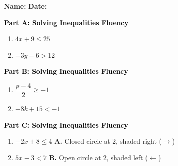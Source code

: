 \documentclass[12pt, letterpaper, fleqn]{article}
\begin{document}
\textbf{Name:} \underline{\hspace{5cm}}
\hfill
\textbf{Date:} \underline{\hspace{3cm}}\\

\begin{tcolorbox}[colback=customteal!20]
\large\textcolor{black}{\textbf{Part A: Solving Inequalities Fluency}}
\end{tcolorbox}

\vspace{3mm}

\begin{enumerate}[itemsep=2.5cm, leftmargin=0.6cm]
\item $4x + 9 \le 25$
\item $-3y - 6 > 12$
\end{enumerate}

\newpage

\begin{tcolorbox}[colback=customteal!20]
\large\textcolor{black}{\textbf{Part B: Solving Inequalities Fluency}}
\end{tcolorbox}

\vspace{3mm}

\begin{enumerate}[itemsep=2.5cm, leftmargin=0.6cm, resume]
\item $\dfrac{p - 4}{2} \ge -1$
\item $-8k + 15 < -1$
\end{enumerate}

\newpage

\begin{tcolorbox}[colback=customteal!20]
\large\textcolor{black}{\textbf{Part C: Solving Inequalities Fluency}}
\end{tcolorbox}

\vspace{3mm}

\begin{enumerate}[itemsep=2.5cm, leftmargin=0.6cm, resume]
\item $-2x + 8 \le 4$ \hfill \textbf{A.} Closed circle at $2$, shaded right ($\rightarrow$)
\item $5x - 3 < 7$ \hfill \textbf{B.} Open circle at $2$, shaded left ($\leftarrow$)
\end{enumerate}
\end{document}
